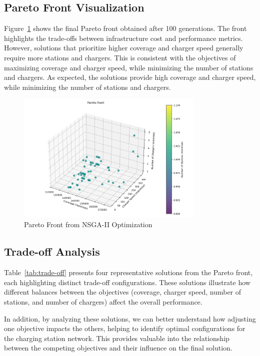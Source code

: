 \subsection{Pareto Front Visualization}

Figure~\ref{fig:pareto-front} shows the final Pareto front obtained after 100 generations. The front highlights the trade-offs between infrastructure cost and performance metrics. However, solutions that prioritize higher coverage and charger speed generally require more stations and chargers. This is consistent with the objectives of maximizing coverage and charger speed, while minimizing the number of stations and chargers. As expected, the solutions provide high coverage and charger speed, while minimizing the number of stations and chargers.

\begin{figure}[h]
    \centering
    \includegraphics[width=0.8\textwidth]{../Figures/Pareto_Front.png}
    \caption{Pareto Front from NSGA-II Optimization}
    \label{fig:pareto-front}
\end{figure}

\subsection{Trade-off Analysis}

Table~\ref{tab:trade-off} presents four representative solutions from the Pareto front, each highlighting distinct trade-off configurations. These solutions illustrate how different balances between the objectives (coverage, charger speed, number of stations, and number of chargers) affect the overall performance. 

In addition, by analyzing these solutions, we can better understand how adjusting one objective impacts the others, helping to identify optimal configurations for the charging station network. This provides valuable into the relationship between the competing objectives and their influence on the final solution.

